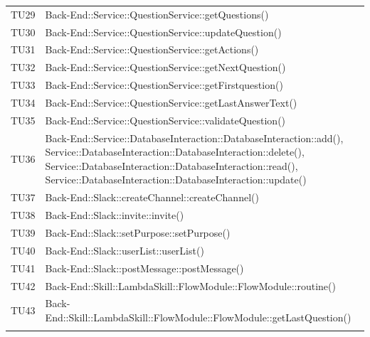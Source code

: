 \documentclass[../PianoDiQualifica_v4.0.0.tex]{subfiles}
\begin{document}
\begin{longtable}[c] { >{\centering\arraybackslash}p{} >{\centering\arraybackslash}p{}}
			TU29 & Back-End::Service::QuestionService::getQuestions() \\
			\addlinespace[0.3em]
			\midrule
			\addlinespace[0.3em]
			TU30 & Back-End::Service::QuestionService::updateQuestion() \\
			\addlinespace[0.3em]
			\midrule
			\addlinespace[0.3em]
			TU31 & Back-End::Service::QuestionService::getActions() \\
			\addlinespace[0.3em]
			\midrule
			\addlinespace[0.3em]
			TU32 & Back-End::Service::QuestionService::getNextQuestion() \\
			\addlinespace[0.3em]
			\midrule
			\addlinespace[0.3em]
			TU33 & Back-End::Service::QuestionService::getFirstquestion() \\
			\addlinespace[0.3em]
			\midrule
			\addlinespace[0.3em]
			TU34 & Back-End::Service::QuestionService::getLastAnswerText() \\
			\addlinespace[0.3em]
			\midrule
			\addlinespace[0.3em]
			TU35 & Back-End::Service::QuestionService::validateQuestion() \\
			\addlinespace[0.3em]
			\midrule
			\addlinespace[0.3em]
			TU36 & Back-End::Service::DatabaseInteraction::DatabaseInteraction::add(), Service::DatabaseInteraction::DatabaseInteraction::delete(), Service::DatabaseInteraction::DatabaseInteraction::read(), Service::DatabaseInteraction::DatabaseInteraction::update() \\
			\addlinespace[0.3em]
			\midrule
			\addlinespace[0.3em]
			TU37 & Back-End::Slack::createChannel::createChannel() \\
			\addlinespace[0.3em]
			\midrule
			\addlinespace[0.3em]
			TU38 & Back-End::Slack::invite::invite() \\
			\addlinespace[0.3em]
			\midrule
			\addlinespace[0.3em]
			TU39 & Back-End::Slack::setPurpose::setPurpose() \\
			\addlinespace[0.3em]
			\midrule
			\addlinespace[0.3em]
			TU40 & Back-End::Slack::userList::userList() \\
			\addlinespace[0.3em]
			\midrule
			\addlinespace[0.3em]
			TU41 & Back-End::Slack::postMessage::postMessage() \\
			\addlinespace[0.3em]
			\midrule
			\addlinespace[0.3em]
			TU42 & Back-End::Skill::LambdaSkill::FlowModule::FlowModule::routine() \\
			\addlinespace[0.3em]
			\midrule
			\addlinespace[0.3em]
			TU43 & Back-End::Skill::LambdaSkill::FlowModule::FlowModule::getLastQuestion() \\
			\addlinespace[0.3em]

\end{longtable}
\end{document}
